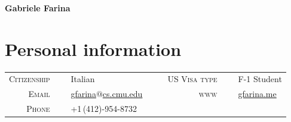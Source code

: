\documentclass[10PT,letter]{article}
\title{}
\newcommand{\numbox}[1]{} %
\begin{document}
\noindent{}%
	{\fontsize{34}{36}\mdseries\upshape\sffamily\bfseries Gabriele Farina}
	
    \vspace{2.0cm}
    \section*{\numbox{1}\bfseries\textcolor{titlecol}{\sffamily Personal information}}
              \begin{tabular}{rlcrl}
                \small\textsc{Citizenship}~~~ & \small Italian &~\hspace{3.5cm}~& \small\textsc{US Visa type}~~~ & \small F-1 Student\\[.5mm]
                \small\textsc{Email}~~~ & \small {\href{mailto:gfarina@cs.cmu.edu}{gfarina$@$cs.cmu.edu}} &&
                \small\textsc{www}~~~ & \small \href{http://gfarina.me}{{gfarina.me}}
                \\[.5mm]
                \small\textsc{Phone}~~~ & \small +1\,(412)-954-8732 &&
              \end{tabular}

\end{document}
